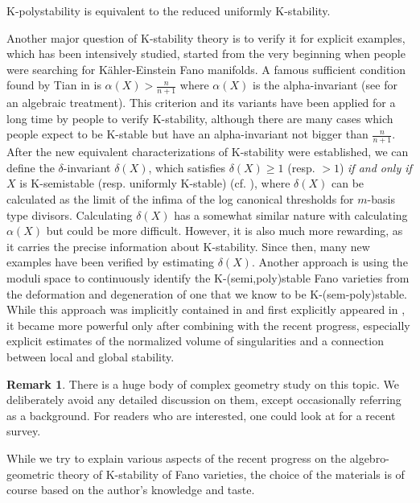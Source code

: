 \documentclass[12pt,reqno]{amsart}%
\theoremstyle{definition}
\newtheorem{rem}[thm]{Remark}
\theoremstyle{remark}
\begin{document}
K-polystability is equivalent to the reduced uniformly K-stability.  

\medskip

Another major question of K-stability theory is to verify it for explicit examples, which has been intensively studied, started from the very beginning when people were searching for K\"ahler-Einstein Fano manifolds. A famous sufficient condition found by Tian in \cite{Tia87} is $\alpha(X)>\frac{n}{n+1}$ where $\alpha(X)$ is the alpha-invariant (see \cite{OS12} for an algebraic treatment).  This criterion and its variants have been applied for a long time by people to verify K-stability, although there are many cases which people expect to be K-stable but have an alpha-invariant not bigger than $\frac{n}{n+1}$. After the new equivalent characterizations of K-stability were established, we can define the $\delta$-invariant $\delta(X)$, which satisfies $\delta(X)\ge 1$ (resp. $>1$) {\it if and only if} $X$ is K-semistable (resp. uniformly K-stable) (cf. \cite{FO18, BJ20}), where $\delta(X)$ can be calculated as  the limit of the infima of the log canonical thresholds for $m$-basis type divisors. Calculating $\delta(X)$ has a somewhat similar nature with calculating $\alpha(X)$ but could be more difficult. However, it is also much more rewarding, as it carries the precise information about K-stability. Since then, many new examples have been verified by estimating $\delta(X)$.   
Another approach is using the moduli space to continuously identify the K-(semi,poly)stable Fano varieties from the deformation and degeneration of one that we know to be K-(sem-poly)stable. While this approach was implicitly contained in \cite{Tia90} and first explicitly appeared in \cite{MM93}, it became more powerful only after combining with the recent progress, especially explicit estimates of the normalized volume of singularities and a connection between local and global stability.



\begin{rem}There is a huge body of complex geometry study on this topic. We deliberately avoid any detailed discussion on them, except occasionally referring as a background. For readers who are interested, one could look at \cite{Sze18} for a recent survey. 

While we try to explain  various aspects of the recent progress on the algebro-geometric theory of K-stability of Fano varieties, the choice of the materials is of course based on the author's knowledge and taste.  
\end{rem}
\end{document}
